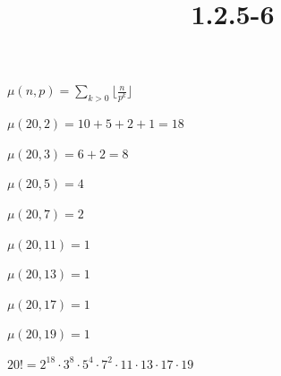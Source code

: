 \documentclass{article}
\title{1.2.5-6}
\begin{document}
\maketitle

\( \mu(n,p) = \sum_{k > 0}{\lfloor{\frac{n}{p^k}}\rfloor} \)

\( \mu(20,2) = 10 + 5 + 2 + 1 = 18 \)

\( \mu(20,3) = 6 + 2 = 8 \)

\( \mu(20,5) = 4 \)

\( \mu(20,7) = 2 \)

\( \mu(20,11) = 1 \)

\( \mu(20,13) = 1 \)

\( \mu(20,17) = 1 \)

\( \mu(20,19) = 1 \)

\( 20! = 2^{18} \cdot 3^8 \cdot 5^4 \cdot 7^2 \cdot 11 \cdot 13 \cdot 17 \cdot 19 \)
\end{document}
